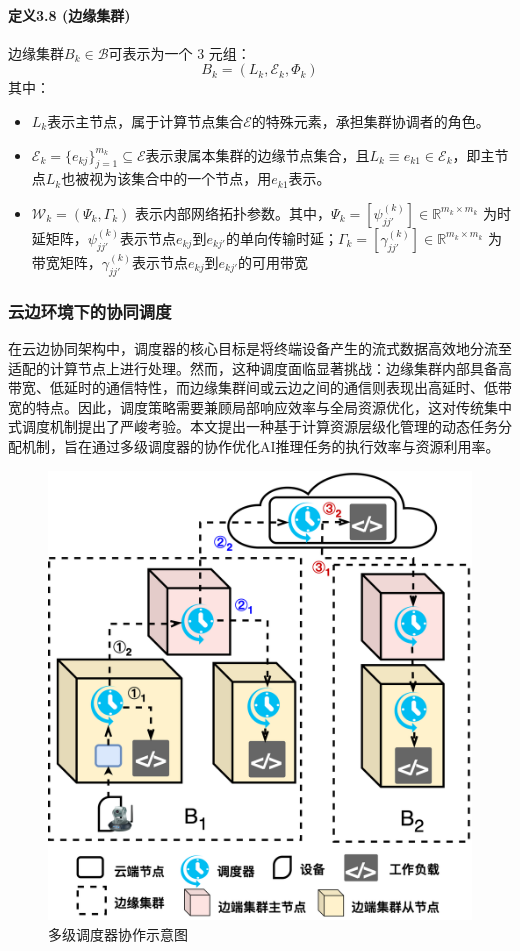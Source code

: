 \paragraph{定义3.8 (边缘集群)} 边缘集群$B_k \in \mathcal{B}$可表示为一个 3 元组：
\[
B_k = (L_k, \mathcal{E}_k, \Phi_k)
\]
其中：
\begin{itemize}
    \item $L_k$表示主节点，属于计算节点集合$\mathcal{E}$的特殊元素，承担集群协调者的角色。
    \item $\mathcal{E}_k = \{e_{kj}\}_{j=1}^{m_k} \subseteq \mathcal{E}$表示隶属本集群的边缘节点集合，且$L_k \equiv e_{k1} \in \mathcal{E}_k$，即主节点$L_k$也被视为该集合中的一个节点，用$e_{k1}$表示。
    \item $\mathcal{W}_k = (\Psi_k, \Gamma_k)$ 表示内部网络拓扑参数。其中，$\Psi_k = [\psi_{jj'}^{(k)}] \in \mathbb{R}^{m_k \times m_k}$ 为时延矩阵，$\psi_{jj'}^{(k)}$表示节点$e_{kj}$到$e_{kj'}$的单向传输时延；$\Gamma_k = [\gamma_{jj'}^{(k)}] \in \mathbb{R}^{m_k \times m_k}$ 为带宽矩阵，$\gamma_{jj'}^{(k)}$表示节点$e_{kj}$到$e_{kj'}$的可用带宽
\end{itemize}

\subsubsection{云边环境下的协同调度}

在云边协同架构中，调度器的核心目标是将终端设备产生的流式数据高效地分流至适配的计算节点上进行处理。然而，这种调度面临显著挑战：边缘集群内部具备高带宽、低延时的通信特性，而边缘集群间或云边之间的通信则表现出高延时、低带宽的特点。因此，调度策略需要兼顾局部响应效率与全局资源优化，这对传统集中式调度机制提出了严峻考验。本文提出一种基于计算资源层级化管理的动态任务分配机制，旨在通过多级调度器的协作优化AI推理任务的执行效率与资源利用率。

\begin{figure}[h]
  \centering
  \includegraphics[width=0.6\linewidth]{pics/3-6调度器.png}
  \caption{多级调度器协作示意图}
  \label{fig:3-6scheduler}
\end{figure}

